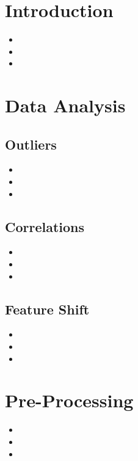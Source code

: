 \documentclass{article}
\begin{document}
	
	
\section{Introduction}

\begin{itemize}
	\item 
	\item 
	\item 
\end{itemize}

\section{Data Analysis}
    \subsection{Outliers}
	\begin{itemize}
		\item 
		\item 
		\item 
	\end{itemize}
   	
    \subsection{Correlations}
	\begin{itemize}
		\item 
		\item 
		\item 
	\end{itemize}
   
    \subsection{Feature Shift}
	\begin{itemize}
		\item 
		\item 
		\item 
	\end{itemize}    



\section{Pre-Processing}
\begin{itemize}
	\item 
	\item 
	\item 
\end{itemize}
\end{document}
